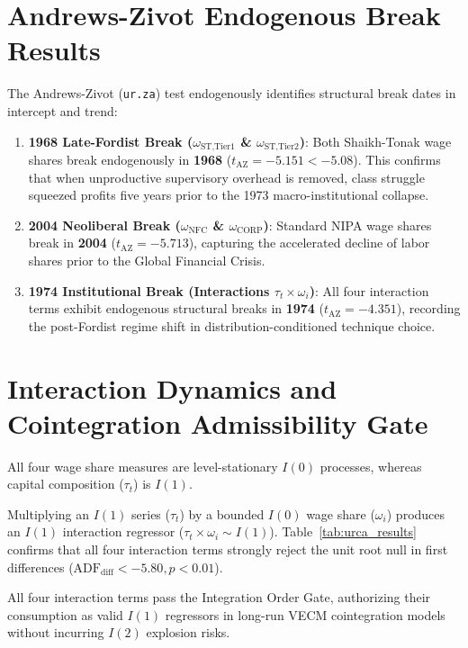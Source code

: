 \documentclass[11pt,a4paper]{article}
\begin{document}
\FloatBarrier
\section{Andrews-Zivot Endogenous Break Results}

The Andrews-Zivot (\texttt{ur.za}) test endogenously identifies structural break dates in intercept and trend:
\begin{enumerate}
    \item \textbf{1968 Late-Fordist Break ($\omega_{\text{ST,Tier1}}$ \& $\omega_{\text{ST,Tier2}}$)}: Both Shaikh-Tonak wage shares break endogenously in \textbf{1968} ($t_{\text{AZ}} = -5.151 < -5.08$). This confirms that when unproductive supervisory overhead is removed, class struggle squeezed profits five years prior to the 1973 macro-institutional collapse.
    \item \textbf{2004 Neoliberal Break ($\omega_{\text{NFC}}$ \& $\omega_{\text{CORP}}$)}: Standard NIPA wage shares break in \textbf{2004} ($t_{\text{AZ}} = -5.713$), capturing the accelerated decline of labor shares prior to the Global Financial Crisis.
    \item \textbf{1974 Institutional Break (Interactions $\tau_t \times \omega_i$)}: All four interaction terms exhibit endogenous structural breaks in \textbf{1974} ($t_{\text{AZ}} = -4.351$), recording the post-Fordist regime shift in distribution-conditioned technique choice.
\end{enumerate}

\FloatBarrier
\section{Interaction Dynamics and Cointegration Admissibility Gate}

All four wage share measures are level-stationary $I(0)$ processes, whereas capital composition ($\tau_t$) is $I(1)$.

Multiplying an $I(1)$ series ($\tau_t$) by a bounded $I(0)$ wage share ($\omega_i$) produces an $I(1)$ interaction regressor ($\tau_t \times \omega_i \sim I(1)$). Table~\ref{tab:urca_results} confirms that all four interaction terms strongly reject the unit root null in first differences ($\text{ADF}_{\text{diff}} < -5.80, p < 0.01$). 

All four interaction terms pass the Integration Order Gate, authorizing their consumption as valid $I(1)$ regressors in long-run VECM cointegration models without incurring $I(2)$ explosion risks.
\end{document}
